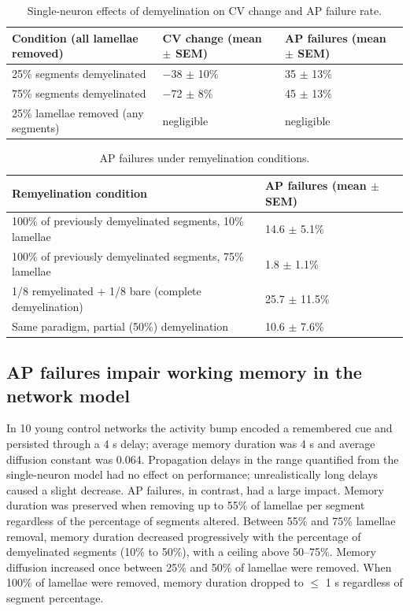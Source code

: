 \documentclass[11pt]{article}
\begin{document}
\begin{table}[h]
\centering
\caption{Single-neuron effects of demyelination on CV change and AP failure rate.}
\begin{tabular}{lll}
\toprule
Condition (all lamellae removed) & CV change (mean $\pm$ SEM) & AP failures (mean $\pm$ SEM) \\
\midrule
25\% segments demyelinated & $-$38 $\pm$ 10\% & 35 $\pm$ 13\% \\
75\% segments demyelinated & $-$72 $\pm$ 8\% & 45 $\pm$ 13\% \\
25\% lamellae removed (any segments) & negligible & negligible \\
\bottomrule
\end{tabular}
\end{table}

\begin{table}[h]
\centering
\caption{AP failures under remyelination conditions.}
\begin{tabular}{ll}
\toprule
Remyelination condition & AP failures (mean $\pm$ SEM) \\
\midrule
100\% of previously demyelinated segments, 10\% lamellae & 14.6 $\pm$ 5.1\% \\
100\% of previously demyelinated segments, 75\% lamellae & 1.8 $\pm$ 1.1\% \\
1/8 remyelinated + 1/8 bare (complete demyelination) & 25.7 $\pm$ 11.5\% \\
Same paradigm, partial (50\%) demyelination & 10.6 $\pm$ 7.6\% \\
\bottomrule
\end{tabular}
\end{table}

\subsection{AP failures impair working memory in the network model}
In 10 young control networks the activity bump encoded a remembered cue and persisted through a 4 s delay; average memory duration was 4 s and average diffusion constant was 0.064. Propagation delays in the range quantified from the single-neuron model had no effect on performance; unrealistically long delays caused a slight decrease. AP failures, in contrast, had a large impact. Memory duration was preserved when removing up to 55\% of lamellae per segment regardless of the percentage of segments altered. Between 55\% and 75\% lamellae removal, memory duration decreased progressively with the percentage of demyelinated segments (10\% to 50\%), with a ceiling above 50--75\%. Memory diffusion increased once between 25\% and 50\% of lamellae were removed. When 100\% of lamellae were removed, memory duration dropped to $\leq$ 1 s regardless of segment percentage.
\end{document}
